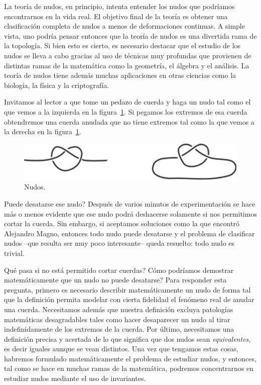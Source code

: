 \documentclass[graybox]{svmult}
\begin{document}
La teoría de nudos, en principio, intenta entender los nudos que podríamos
encontrarnos en la vida real. 
El objetivo final de la teoría es obtener una clasificación completa de nudos a
menos de deformaciones continuas. A simple vista, uno podría pensar entonces
que la teoría de nudos es una divertida rama de la topología. Si bien esto es
cierto, es necesario destacar que el estudio de los nudos se lleva a
cabo gracias al uso de técnicas muy profundas que provienen de distintas ramas
de la matemática como la geometría, el álgebra y el análisis. La teoría de
nudos tiene además muchas aplicaciones en otras ciencias como la biología, la
física y la criptografía. 

Invitamos al lector a que tome un pedazo de cuerda y haga un nudo tal como el
que vemos a la izquierda en la figura~\ref{fig:nudo}. Si pegamos los extremos
de esa cuerda obtendremos una cuerda anudada que no tiene extremos tal como la
que vemos a la derecha en la figura~\ref{fig:nudo}.

\begin{figure}
    \centering
	\includegraphics[scale=0.7]{images/real}
    \caption{Nudos.}
    \label{fig:nudo}
\end{figure}

\textquestiondown Puede desatarse ese nudo? Después de varios minutos de
experimentación se hace más o menos evidente que ese nudo podrá deshacerse
solamente si nos permitimos cortar la cuerda. Sin embargo, si aceptamos
soluciones como la que encontró Alejandro Magno, entonces todo nudo puede
desatarse y el problema de clasificar nudos --que resulta ser muy poco
interesante-- queda resuelto: todo nudo es trivial.  

\textquestiondown Qué pasa si no está permitido cortar cuerdas?
\textquestiondown Cómo podríamos demostrar matemáticamente que un nudo no puede
desatarse?  Para responder esta pregunta, primero es necesario describir
matemáticamente un nudo de forma tal que la definición permita modelar con
cierta fidelidad el fenómeno real de anudar una cuerda. Necesitamos además que
nuestra definición excluya patologías matemáticas desagradables tales como
hacer desaparecer un nudo al tirar indefinidamente de los extremos de la
cuerda.  Por último, necesitamos una definición precisa y acertada de lo que
significa que dos nudos sean \emph{equivalentes}, es decir iguales aunque se
vean distintos. Una vez que tengamos estas cosas, habremos formulado
matemáticamente el problema de estudiar nudos, y entonces, tal como se hace en
muchas ramas de la matemática, podremos concentrarnos en estudiar nudos
mediante el uso de invariantes. 
\end{document}
